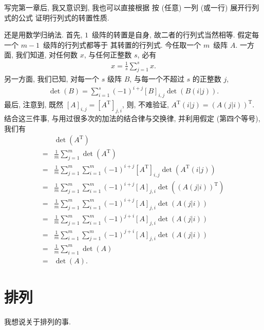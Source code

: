 \documentclass[%
    UTF8,%
    fontset=none,%
    punct=kaiming,%
    zihao=-4,%
    a4paper,%
    oneside,%
]{ctexbook}
\begin{document}
写完第一章后, 我又意识到, 我也可以直接根据%
按 (任意) 一列 (或一行) 展开行列式的公式%
证明行列式的转置性质.

还是用数学归纳法.
首先, \(1\)~级阵的转置是自身,
故二者的行列式当然相等.
假定每一个 \(m - 1\)~级阵的行列式都等于%
其转置的行列式.
今任取一个 \(m\)~级阵 \(A\).
一方面, 我们知道,
对任何数 \(x\), 与任何正整数 \(s\),
必有
\begin{align*}
    x = \frac{1}{s} \sum_{j = 1}^{s} {x}.
\end{align*}
另一方面, 我们已知,
对每一个 \(s\) 级阵 \(B\),
与每一个不超过 \(s\) 的正整数 \(j\),
\begin{align*}
    \det {(B)}
    = \sum_{i = 1}^{s} {(-1)^{i+j} [B]_{i,j} \det {(B(i|j))}}.
\end{align*}
最后, 注意到, 既然
\([A]_{i,j} = [A^{\mathrm{T}}]_{j,i}\),
则, 不难验证,
\(A^{\mathrm{T}}(i|j) = (A(j|i))^{\mathrm{T}}\).
结合这三件事,
与用过很多次的加法的结合律与交换律,
并利用假定 (第四个等号), 我们有
\begin{align*}
         & \det {(A^{\mathrm{T}})}
    \\
    = {} &
    \frac{1}{m}
    \sum_{j=1}^{m}
    {\det {(A^{\mathrm{T}})}}
    \\
    = {} &
    \frac{1}{m}
    \sum_{j=1}^{m} {
    \sum_{i=1}^{m} {
    (-1)^{i+j} [A^{\mathrm{T}}]_{i,j}
    \det {(A^{\mathrm{T}}(i|j))}}}
    \\
    = {} &
    \frac{1}{m}
    \sum_{j=1}^{m} {
    \sum_{i=1}^{m} {
    (-1)^{i+j} [A]_{j,i}
    \det {((A(j|i))^{\mathrm{T}})}}}
    \\
    = {} &
    \frac{1}{m}
    \sum_{j=1}^{m} {
    \sum_{i=1}^{m} {
    (-1)^{i+j} [A]_{j,i}
    \det {(A(j|i))}}}
    \\
    = {} &
    \frac{1}{m}
    \sum_{j=1}^{m} {
    \sum_{i=1}^{m} {
    (-1)^{j+i} [A]_{j,i}
    \det {(A(j|i))}}}
    \\
    = {} &
    \frac{1}{m}
    \sum_{i=1}^{m} {
    \sum_{j=1}^{m} {
    (-1)^{j+i} [A]_{j,i}
    \det {(A(j|i))}}}
    \\
    = {} &
    \frac{1}{m}
    \sum_{i=1}^{m}
    {\det {(A)}}
    \\
    = {} & \det {(A)}.
\end{align*}

\section{排列}

我想说关于排列的事.
\end{document}
